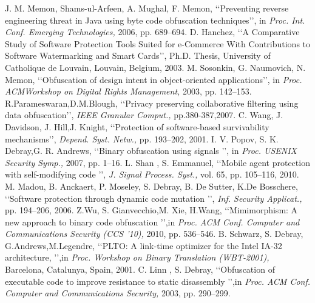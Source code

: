 \documentclass[12pt,a4paper,final]{extreport}
\begin{document}
\begin{thebibliography}{9}
J. M. Memon, Shams-ul-Arfeen, A. Mughal, F. Memon, \lq\lq Preventing reverse engineering threat in Java using byte code obfuscation techniques\rq\rq, in \textit {Proc. Int. Conf. Emerging Technologies,} 2006, pp.
689–694. 
 D. Hanchez, \lq\lq A Comparative Study of Software Protection Tools
Suited for e-Commerce With Contributions to Software Watermarking
and Smart Cards\rq\rq , Ph.D. Thesis, University of Catholique de Louvain,
Louvain, Belgium, 2003.
M. Sosonkin, G. Naumovich, N. Memon, \lq\lq Obfuscation of design
intent in object-oriented applications\rq\rq, in \textit {Proc. ACMWorkshop on Digital Rights Management,} 2003, pp. 142–153.
R.Parameswaran,D.M.Blough, \lq\lq Privacy preserving collaborative filtering using data obfuscation\rq\rq, \textit {IEEE Granular Comput.,} pp.380-387,2007.
C. Wang, J. Davidson, J. Hill,J. Knight,  \lq\lq Protection of software-based survivability mechanisms\rq\rq, \textit{Depend. Syst. Netw.,} pp. 193–202,
2001.
I. V. Popov, S. K. Debray,G. R. Andrews, \lq\lq Binary obfuscation using signals
\rq\rq , in \textit {Proc. USENIX Security Symp.,} 2007, pp. 1–16.
L. Shan , S. Emmanuel,  \lq\lq Mobile agent protection with self-modifying code
\rq\rq , \textit {J. Signal Process. Syst., } vol. 65, pp. 105–116, 2010.
M. Madou, B. Anckaert, P. Moseley, S. Debray, B. De Sutter, K.De Bosschere,   \lq\lq Software protection through dynamic code mutation
\rq\rq , \textit {Inf. Security Applicat., } pp. 194–206, 2006.
Z.Wu, S. Gianvecchio,M. Xie, H.Wang,    \lq\lq Mimimorphism: A new
approach to binary code obfuscation
\rq\rq ,in \textit {Proc. ACM Conf. Computer
and Communications Security (CCS ’10), } 2010, pp. 536–546.
B. Schwarz, S. Debray, G.Andrews,M.Legendre,     \lq\lq PLTO: A link-time optimizer for the Intel IA-32 architecture,
\rq\rq ,in \textit {Proc. Workshop on
Binary Translation (WBT-2001),} Barcelona, Catalunya, Spain, 2001.
C. Linn , S. Debray,      \lq\lq Obfuscation of executable code to improve resistance to static disassembly
\rq\rq ,in \textit {Proc. ACM Conf. Computer and
Communications Security,} 2003, pp. 290–299.
\end{thebibliography}
\end{document}
